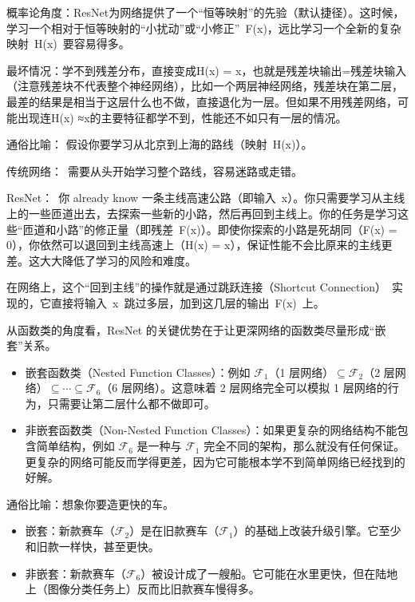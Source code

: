 概率论角度：ResNet为网络提供了一个``恒等映射''的先验（默认捷径）。这时候，学习一个相对于恒等映射的``小扰动''或``小修正''~F(x)，远比学习一个全新的复杂映射~H(x)~要容易得多。

最坏情况：学不到残差分布，直接变成H(x) = x，也就是残差块输出=残差块输入（注意残差块不代表整个神经网络），比如一个两层神经网络，残差块在第二层，最差的结果是相当于这层什么也不做，直接退化为一层。但如果不用残差网络，可能出现连H(x) ≈x的主要特征都学不到，性能还不如只有一层的情况。

通俗比喻：
假设你要学习从北京到上海的路线（映射~H(x)）。

传统网络：~需要从头开始学习整个路线，容易迷路或走错。

ResNet：~你 already know 一条主线高速公路（即输入~x）。你只需要学习从主线上的一些匝道出去，去探索一些新的小路，然后再回到主线上。你的任务是学习这些``匝道和小路''的修正量（即残差~F(x)）。即使你探索的小路是死胡同（F(x) = 0），你依然可以退回到主线高速上（H(x) = x），保证性能不会比原来的主线更差。这大大降低了学习的风险和难度。

在网络上，这个``回到主线''的操作就是通过跳跃连接（Shortcut Connection）~实现的，它直接将输入~x~跳过多层，加到这几层的输出~F(x)~上。

从函数类的角度看，ResNet 的关键优势在于让更深网络的函数类尽量形成``嵌套''关系。

\begin{itemize}
\tightlist
\item
  嵌套函数类（Nested Function Classes）：例如 \(\mathcal{F}_1\)（1 层网络）\(\subseteq \mathcal{F}_2\)（2 层网络）\(\subseteq \cdots \subseteq \mathcal{F}_6\)（6 层网络）。这意味着 2 层网络完全可以模拟 1 层网络的行为，只需要让第二层什么都不做即可。
\item
  非嵌套函数类（Non-Nested Function Classes）：如果更复杂的网络结构不能包含简单结构，例如 \(\mathcal{F}_6\) 是一种与 \(\mathcal{F}_1\) 完全不同的架构，那么就没有任何保证。更复杂的网络可能反而学得更差，因为它可能根本学不到简单网络已经找到的好解。
\end{itemize}

通俗比喻：想象你要造更快的车。

\begin{itemize}
\tightlist
\item
  嵌套：新款赛车（\(\mathcal{F}_2\)）是在旧款赛车（\(\mathcal{F}_1\)）的基础上改装升级引擎。它至少和旧款一样快，甚至更快。
\item
  非嵌套：新款赛车（\(\mathcal{F}_6\)）被设计成了一艘船。它可能在水里更快，但在陆地上（图像分类任务上）反而比旧款赛车慢得多。
\end{itemize}

